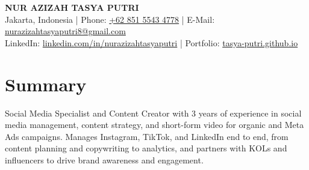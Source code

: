 \documentclass[10pt,letterpaper]{article}
\begin{document}
\fontsize{9.6}{11.2}\selectfont\frenchspacing
\begin{center}
{\bfseries\fontsize{17}{20}\selectfont NUR AZIZAH TASYA PUTRI}\\[4pt]
Jakarta, Indonesia | Phone: \href{tel:+6285155434778}{+62 851 5543 4778} | E-Mail: \href{mailto:nurazizahtasyaputri8@gmail.com}{nurazizahtasyaputri8@gmail.com}\\[2pt]
LinkedIn: \href{https://linkedin.com/in/nurazizahtasyaputri}{linkedin.com/in/nurazizahtasyaputri} | Portfolio: \href{https://tasya-putri.github.io}{tasya-putri.github.io}
\end{center}

\section{Summary}
\vspace{2pt}
Social Media Specialist and Content Creator with 3 years of experience in social media management, content strategy, and short-form video for organic and Meta Ads campaigns. Manages Instagram, TikTok, and LinkedIn end to end, from content planning and copywriting to analytics, and partners with KOLs and influencers to drive brand awareness and engagement.
\end{document}
